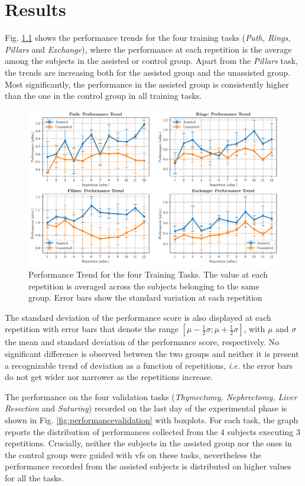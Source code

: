\documentclass[../main.tex]{subfiles}
\begin{document}
\chapter{Results}
Fig. \ref{fig:performancetraining} shows the performance trends for the four training tasks (\textit{Path, Rings, Pillars} and \textit{Exchange}), where the performance at each repetition is the average among the subjects in the assisted or control group. Apart from the \textit{Pillars} task, the trends are increasing both for the assisted group and the unassisted group. Most significantly, the performance in the assisted group is consistently higher than the one in the control group in all training tasks. 

\begin{figure}[h!]
    \centering
    \includegraphics[width=\textwidth]{images/performance_training.png}
    \caption{Performance Trend for the four Training Tasks. The value at each repetition is averaged across the subjects belonging to the same group. Error bars show the standard variation at each repetition}
    \label{fig:performancetraining}
\end{figure}

The standard deviation of the performance score is also displayed at each repetition with error bars that denote the range $\left[\mu - \frac{1}{2}\sigma; \mu + \frac{1}{2}\sigma\right]$, with $\mu$ and $\sigma$ the mean and standard deviation of the performance score, respectively. No significant difference is observed between the two groups and neither it is present a recognizable trend of deviation as a function of repetitions, \textit{i.e.} the error bars do not get wider nor narrower as the repetitions increase.

The performance on the four validation tasks (\textit{Thymectomy, Nephrectomy, Liver Resection} and \textit{Suturing}) recorded on the last day of the experimental phase is shown in Fig. \ref{fig:performancevalidation} with boxplots. For each task, the graph reports the distribution of performances collected from the 4 subjects executing 3 repetitions. Crucially, neither the subjects in the assisted group nor the ones in the control group were guided with \acp{vf} on these tasks, nevertheless the performance recorded from the assisted subjects is distributed on higher values for all the tasks. 
\end{document}
